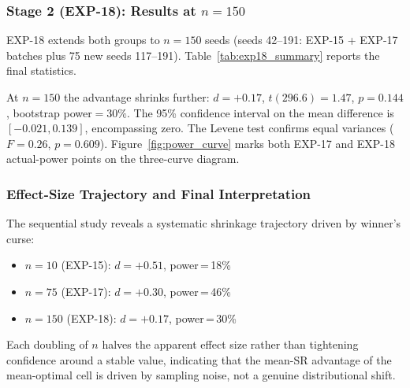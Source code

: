\documentclass[conference]{IEEEtran}
\begin{document}
\subsubsection{Stage 2 (EXP-18): Results at $n=150$}

EXP-18 extends both groups to $n=150$ seeds
(seeds 42--191: EXP-15 + EXP-17 batches
plus 75 new seeds 117--191).
Table~\ref{tab:exp18_summary} reports the final statistics.

\begin{table}[t]
\centering
\caption{EXP-18: $n=150$ Stage~2 comparison, mean-optimal cell
vs.\ baseline (real S\&P~500 test split, 2022--2024).}
\label{tab:exp18_summary}
\end{table}

At $n=150$ the advantage shrinks further: $d=+0.17$,
$t(296.6)=1.47$, $p=0.144$, bootstrap power$=30\%$.
The 95\% confidence interval on the mean difference is
$[-0.021, 0.139]$, encompassing zero.
The Levene test confirms equal variances
($F=0.26$, $p=0.609$).
Figure~\ref{fig:power_curve} marks both EXP-17 and
EXP-18 actual-power points on the three-curve diagram.

\subsubsection{Effect-Size Trajectory and Final Interpretation}

The sequential study reveals a systematic shrinkage
trajectory driven by winner's curse:
\begin{itemize}
  \item $n=10$ (EXP-15): $d=+0.51$, power\,=\,18\%
  \item $n=75$ (EXP-17): $d=+0.30$, power\,=\,46\%
  \item $n=150$ (EXP-18): $d=+0.17$, power\,=\,30\%
\end{itemize}
Each doubling of $n$ halves the apparent effect size
rather than tightening confidence around a stable value,
indicating that the mean-SR advantage of the
mean-optimal cell is driven by sampling noise, not a
genuine distributional shift.
\end{document}
